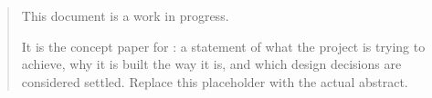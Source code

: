 
\begin{abstract}
\noindent
This document is a work in progress.

It is the concept paper for \AkariOrg: a statement of what the project is
trying to achieve, why it is built the way it is, and which design decisions
are considered settled. Replace this placeholder with the actual abstract.
\end{abstract}

\vspace{1.2\baselineskip}
